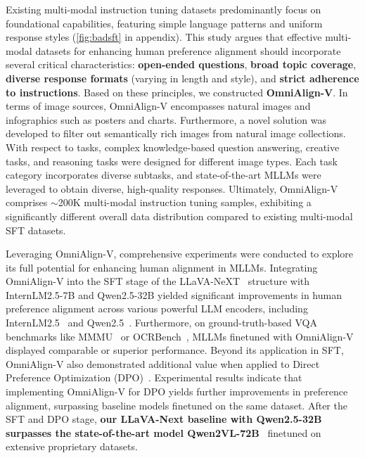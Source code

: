 Existing multi-modal instruction tuning datasets predominantly focus on foundational capabilities, featuring simple language patterns and uniform response styles (\cref{fig:badsft} in appendix).
This study argues that effective multi-modal datasets for enhancing human preference alignment should incorporate several critical characteristics: \textbf{open-ended questions}, \textbf{broad topic coverage}, \textbf{diverse response formats} (varying in length and style), and \textbf{strict adherence to instructions}. 
Based on these principles, we constructed \textbf{OmniAlign-V}.
In terms of image sources, OmniAlign-V encompasses natural images and infographics such as posters and charts. 
Furthermore, a novel solution was developed to filter out semantically rich images from natural image collections.
With respect to tasks, complex knowledge-based question answering, creative tasks, and reasoning tasks were designed for different image types. 
Each task category incorporates diverse subtasks, and state-of-the-art MLLMs were leveraged to obtain diverse, high-quality responses. 
Ultimately, OmniAlign-V comprises $\sim$200K multi-modal instruction tuning samples, 
exhibiting a significantly different overall data distribution compared to existing multi-modal SFT datasets. 

Leveraging OmniAlign-V, comprehensive experiments were conducted to explore its full potential for enhancing human alignment in MLLMs. 
Integrating OmniAlign-V into the SFT stage of the LLaVA-NeXT~\cite{liu2024llavanext} structure with InternLM2.5-7B and Qwen2.5-32B yielded significant improvements in human preference alignment across various powerful LLM encoders, 
including InternLM2.5~\cite{cai2024internlm2} and Qwen2.5~\cite{qwen}. 
Furthermore, on ground-truth-based VQA benchmarks like MMMU~\cite{yue2023mmmu} or OCRBench~\cite{liu2023hidden}, 
MLLMs finetuned with OmniAlign-V displayed comparable or superior performance. 
Beyond its application in SFT, 
OmniAlign-V also demonstrated additional value when applied to Direct Preference Optimization (DPO)~\cite{rafailov2024direct}. 
Experimental results indicate that implementing OmniAlign-V for DPO yields further improvements in preference alignment, 
surpassing baseline models finetuned on the same dataset. After the SFT and DPO stage, \textbf{our LLaVA-Next baseline with Qwen2.5-32B surpasses the state-of-the-art model Qwen2VL-72B}~\cite{chen2024far} finetuned on extensive proprietary datasets.


